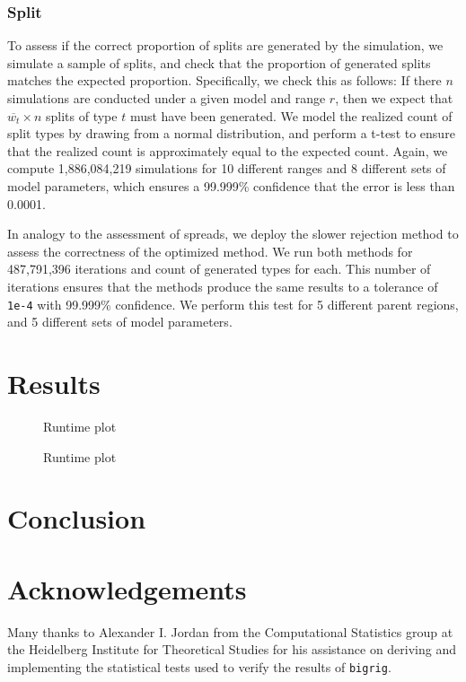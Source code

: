 \documentclass[a4paper]{article}
\newcommand{\bigrig}{\texttt{bigrig}}
\begin{document}
\subsubsection{Split}

To assess if the correct proportion of splits are generated by the simulation,
we simulate a sample of splits, and check that the proportion of generated
splits matches the expected proportion.
Specifically, we check this as follows: If there \(n\) simulations are conducted under a given model
and range \( r \), then we expect that  \(\overline{w_t} \times
n\) splits of type \( t \) must have been generated.
We model the realized count of split types by drawing from a normal
distribution, and perform a t-test to ensure that the realized count is
approximately equal to the expected count.
Again, we compute 1,886,084,219 simulations for 10 different ranges and 8
different sets of model parameters, which ensures a 99.999\% confidence that
the error is less than 0.0001.

In analogy to the assessment of spreads, we deploy the slower rejection method to assess the correctness 
of the optimized method.
We run both methods for 487,791,396 iterations and count of generated types for
each.
This number of iterations ensures that the methods produce the same results to
a tolerance of \texttt{1e-4} with 99.999\% confidence.
We perform this test for 5 different parent regions, and 5 different sets of
model parameters.

\section{Results}

\begin{figure}
    \centering
    
    \caption{Runtime plot}\label{fig:runtime-taxa}
\end{figure}

\begin{figure}
    \centering
    
    \caption{Runtime plot}\label{fig:runtime-regions}
\end{figure}

\section{Conclusion}

\section{Acknowledgements}

Many thanks to Alexander I. Jordan from the Computational Statistics group at the Heidelberg Institute for Theoretical Studies for his assistance on deriving and
implementing the statistical tests used to verify the results of \bigrig{}.



\end{document}
